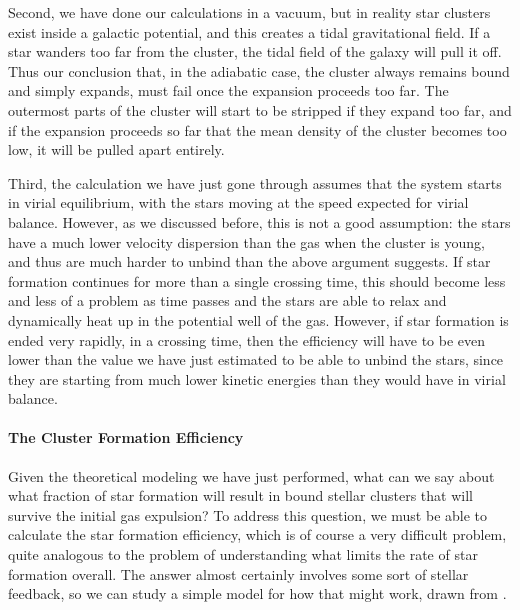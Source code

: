 Second, we have done our calculations in a vacuum, but in reality star clusters exist inside a galactic potential, and this creates a tidal gravitational field. If a star wanders too far from the cluster, the tidal field of the galaxy will pull it off. Thus our conclusion that, in the adiabatic case, the cluster always remains bound and simply expands, must fail once the expansion proceeds too far. The outermost parts of the cluster will start to be stripped if they expand too far, and if the expansion proceeds so far that the mean density of the cluster becomes too low, it will be pulled apart entirely.

Third, the calculation we have just gone through assumes that the system starts in virial equilibrium, with the stars moving at the speed expected for virial balance. However, as we discussed before, this is not a good assumption: the stars have a much lower velocity dispersion than the gas when the cluster is young, and thus are much harder to unbind than the above argument suggests. If star formation continues for more than a single crossing time, this should become less and less of a problem as time passes and the stars are able to relax and dynamically heat up in the potential well of the gas. However, if star formation is ended very rapidly, in a crossing time, then the efficiency will have to be even lower than the value we have just estimated to be able to unbind the stars, since they are starting from much lower kinetic energies than they would have in virial balance.

\paragraph{The Cluster Formation Efficiency}

Given the theoretical modeling we have just performed, what can we say about what fraction of star formation will result in bound stellar clusters that will survive the initial gas expulsion? To address this question, we must be able to calculate the star formation efficiency, which is of course a very difficult problem, quite analogous to the problem of understanding what limits the rate of star formation overall. The answer almost certainly involves some sort of stellar feedback, so we can study a simple model for how that might work, drawn from \citet{fall10a}.

